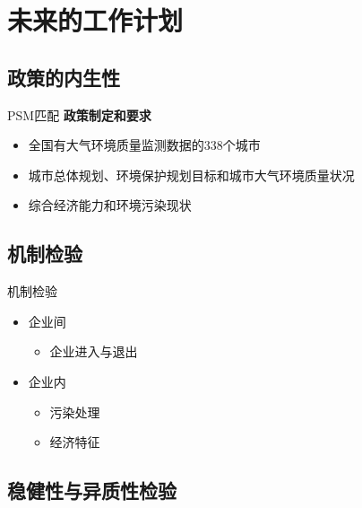 \documentclass[11pt,compress,xcolor=x11names,UTF8]{beamer}
\begin{document}
\section{未来的工作计划}
\subsection{政策的内生性}
	\begin{frame}{PSM匹配}
		\textbf{政策制定和要求}
		\begin{itemize}
		\item 全国有大气环境质量监测数据的338个城市
		\item 城市总体规划、环境保护规划目标和城市大气环境质量状况
		\item 综合经济能力和环境污染现状
		\end{itemize}
	\end{frame}
\subsection{机制检验}
	\begin{frame}{机制检验}
		\begin{itemize}
			\item 企业间
			\begin{itemize}
				\item 企业进入与退出
			\end{itemize}
			\item 企业内
			\begin{itemize}
				\item 污染处理
				\item 经济特征
			\end{itemize}
			
		\end{itemize}
		

	\end{frame}
\subsection{稳健性与异质性检验}
\end{document}
